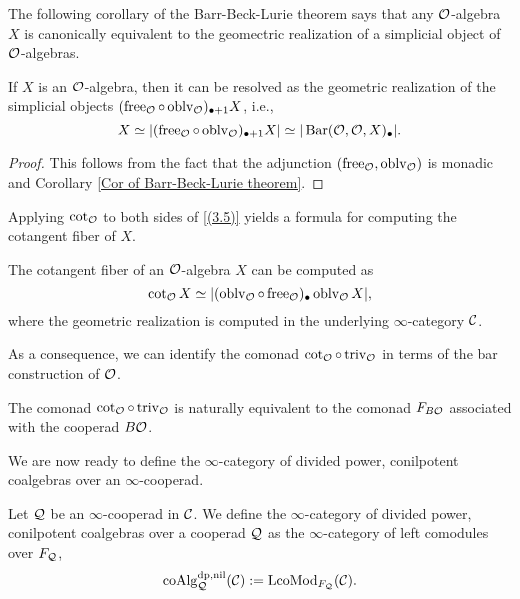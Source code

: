The following corollary of the Barr-Beck-Lurie theorem \cite[Theorem 4.7.3.5.]{HA} says that any ${\mathcal{O}}$-algebra $X$ is canonically equivalent to the geomectric realization of a simplicial object of ${\mathcal{O}}$-algebras.
\begin{proposition}
\label{free resolutino of O-algebras}
If $X$ is an ${\mathcal{O}}$-algebra, then it can be resolved as the geometric realization of the simplicial objects $(\operatorname{free}_{{\mathcal{O}}}\circ \operatorname{oblv}_{{\mathcal{O}}})_{\bullet + 1}X$, i.e., 
\begin{equation}
\label{(3.5)}
    X \simeq
|(\operatorname{free}_{{\mathcal{O}}}\circ \operatorname{oblv}_{{\mathcal{O}}})_{\bullet + 1}X|
\simeq |\operatorname{Bar}({\mathcal{O}}, {\mathcal{O}}, X)_{\bullet}|.
\end{equation}
\end{proposition}
\begin{proof}
    This follows from the fact that the adjunction $(\operatorname{free}_{{\mathcal{O}}}, \operatorname{oblv}_{{\mathcal{O}}})$ is monadic and Corollary \ref{Cor of Barr-Beck-Lurie theorem}.
    
\end{proof}
Applying $\cot_{{\mathcal{O}}}$ to both sides of \eqref{(3.5)} yields a formula for computing the cotangent fiber of $X$. 
\begin{corollary}
\cite[Proposition 4.4]{Heuts_Koszul}
The cotangent fiber of an ${\mathcal{O}}$-algebra $X$ can be computed as 
$$
\cot_{{\mathcal{O}}}X \simeq 
|(\operatorname{oblv}_{{\mathcal{O}}}\circ \operatorname{free}_{{\mathcal{O}}})_{\bullet}\operatorname{oblv}_{{\mathcal{O}}}X|,
$$
where the geometric realization is computed in the underlying $\infty$-category ${\mathcal{C}}$.
\end{corollary}

As a consequence, we can identify the comonad $\cot_{{\mathcal{O}}}\circ \operatorname{triv}_{{\mathcal{O}}}$ in terms of the bar construction of ${\mathcal{O}}$.
\begin{proposition}
\label{cot triv is F_BO}
\cite[Proposition 4.5]{Heuts_Koszul}
The comonad $\cot_{{\mathcal{O}}}\circ \operatorname{triv}_{{\mathcal{O}}}$ is naturally equivalent to the comonad $F_{B{\mathcal{O}}}$ associated with the cooperad $B{\mathcal{O}}$.
\end{proposition}

We are now ready to define the $\infty$-category of divided power, conilpotent coalgebras over an $\infty$-cooperad.
\begin{definition}
\label{coalgebras over a cooperad}
	Let ${\mathcal{Q}}$ be an $\infty$-cooperad in ${\mathcal{C}}$. We define the $\infty$-category of divided power, conilpotent coalgebras over a cooperad ${\mathcal{Q}}$ as the $\infty$-category of left comodules over $F_{{\mathcal{Q}}}$,
	$$
	\operatorname{coAlg}^{\operatorname{dp}, \operatorname{nil}}_{{\mathcal{Q}}}({\mathcal{C}}):= \operatorname{LcoMod}_{F_{{\mathcal{Q}}}}({\mathcal{C}}).
	$$
\end{definition}

